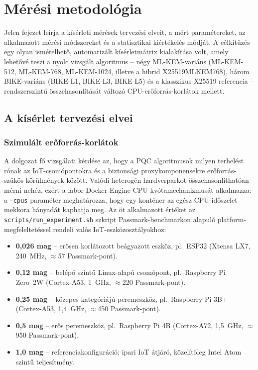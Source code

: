\chapter{Mérési metodológia}

Jelen fejezet leírja a kísérleti mérések tervezési elveit, a mért paramétereket, az alkalmazott
mérési módszereket és a statisztikai kiértékelés módját. A célkitűzés egy olyan ismételhető,
automatizált kísérletmátrix kialakítása volt, amely lehetővé teszi a nyolc vizsgált algoritmus --
négy ML-KEM-variáns (ML-KEM-512, ML-KEM-768, ML-KEM-1024, illetve a hibrid X25519MLKEM768),
három BIKE-variáns (BIKE-L1, BIKE-L3, BIKE-L5) és a klasszikus X25519 referencia --
rendszerszintű összehasonlítását változó CPU-erőforrás-korlátok mellett.

\section{A kísérlet tervezési elvei}

\subsection{Szimulált erőforrás-korlátok}

A dolgozat fő vizsgálati kérdése az, hogy a PQC algoritmusok milyen terhelést rónak az
IoT-csomópontokra és a biztonsági proxykomponensekre erőforrás-szűkös körülmények között.
Valódi heterogén hardverparkot összehasonlíthatóan mérni nehéz, ezért a labor Docker Engine
CPU-kvótamechanizmusát alkalmazza: a \texttt{--cpus} paraméter meghatározza, hogy egy konténer
az egész CPU-időszelet mekkora hányadát kaphatja meg. Az öt alkalmazott értéket az
\texttt{scripts/run\_experiment.sh} szkript Passmark-benchmarkon alapuló platform-megfeleltetéssel
rendeli valós IoT-eszközosztályokhoz:

\begin{itemize}
    \item \textbf{0,026 mag} -- erősen korlátozott beágyazott eszköz, pl.\ ESP32
          (Xtensa LX7, 240~MHz, $\approx$57 Passmark-pont).
    \item \textbf{0,12 mag} -- belépő szintű Linux-alapú csomópont, pl.\ Raspberry Pi
          Zero~2W (Cortex-A53, 1~GHz, $\approx$220 Passmark-pont).
    \item \textbf{0,25 mag} -- közepes kategóriájú peremeszköz, pl.\ Raspberry Pi 3B+
          (Cortex-A53, 1,4~GHz, $\approx$450 Passmark-pont).
    \item \textbf{0,5 mag} -- erős peremeszköz, pl.\ Raspberry Pi 4B
          (Cortex-A72, 1,5~GHz, $\approx$950 Passmark-pont).
    \item \textbf{1,0 mag} -- referenciakonfiguráció; ipari IoT átjáró, közelítőleg
          Intel Atom szintű teljesítmény.
\end{itemize}


